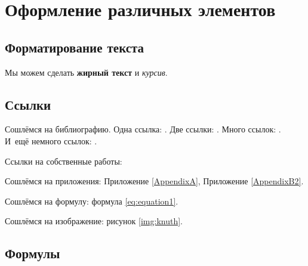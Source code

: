 \chapter{Оформление различных элементов} \label{chapt1}

\section{Форматирование текста} \label{sect1_1}

Мы можем сделать \textbf{жирный текст} и \textit{курсив}.

\section{Ссылки} \label{sect1_2}
Сошлёмся на библиографию.
Одна ссылка: \cite[с.~54]{Sokolov}\cite[с.~36]{Gaidaenko}.
Две ссылки: \cite{Sokolov,Gaidaenko}.
Много ссылок: %
\cite{Lermontov,Management,Borozda,Marketing,Constitution,FamilyCode,Gost.7.0.53,Razumovski,Lagkueva,Pokrovski,Sirotko,Lukina,Methodology,Encyclopedia,Nasirova,Berestova,Kriger}.
И~ещё немного ссылок:
\cite{Article,Book,Booklet,Conference,Inbook,Incollection,Manual,Mastersthesis,Misc,Phdthesis,Proceedings,Techreport,Unpublished}.
\cite{medvedev2006jelektronnye, CEAT:CEAT581, doi:10.1080/01932691.2010.513279,Gosele1999161,Li2007StressAnalysis, Shoji199895,test:eisner-sample,test:eisner-sample-shorted,AB_patent_Pomerantz_1968,iofis_patent1960}



Ссылки на собственные работы:~\cite{authorpapervak_1, authorpaperscopus_1}

Сошлёмся на приложения: Приложение \ref{AppendixA}, Приложение \ref{AppendixB2}.

Сошлёмся на формулу: формула \eqref{eq:equation1}.

Сошлёмся на изображение: рисунок \ref{img:knuth}.

\section{Формулы} \label{sect1_3}

